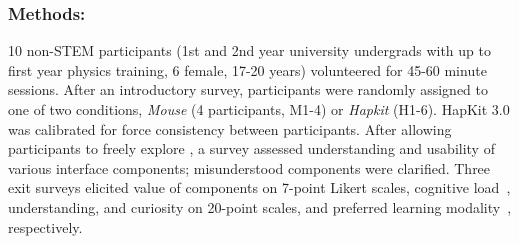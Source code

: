 \subsubsection{Methods:}
10 non-STEM participants (1st and 2nd year university undergrads with up to first year  physics training, 6 female, 17-20 years) volunteered for 45-60 minute sessions.
After an introductory survey, participants were randomly assigned to one of two conditions, \textit{Mouse} (4 participants, M1-4) or \textit{Hapkit} (H1-6).
HapKit 3.0 was calibrated for force consistency between participants.
After allowing participants to freely explore \SpringSim, %
a survey assessed %
understanding and usability of various \SpringSim interface components;
misunderstood components were clarified.
Three exit surveys elicited 
value of \SpringSim components on 7-point Likert scales, 
cognitive load~\cite{jones_1990}, understanding, and curiosity on 20-point scales,
and preferred learning modality~\cite{vark}, respectively.


